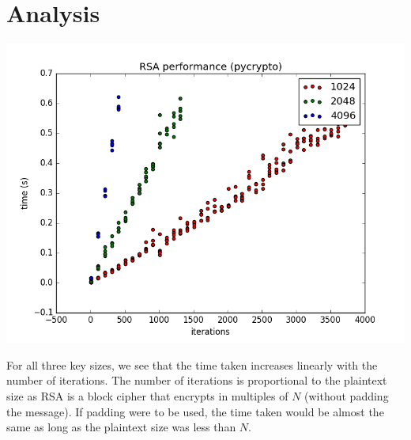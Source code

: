 \documentclass[main.tex]{subfiles}
\begin{document}
\section{Analysis}

\includegraphics[width=\textwidth]{plot.png}

For all three key sizes, we see that the time taken increases linearly with the
number of iterations. The number of iterations is proportional to the plaintext
size as RSA is a block cipher that encrypts in multiples of $N$ (without
padding the message). If padding were to be used, the time taken would be almost
the same as long as the plaintext size was less than $N$.
\end{document}
